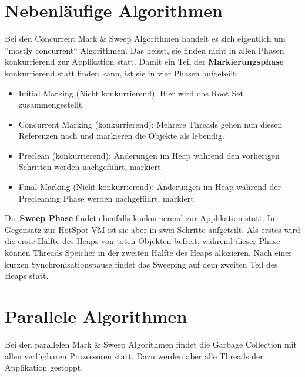 \section{Nebenläufige Algorithmen}
Bei den Concurrent Mark \& Sweep Algorithmen handelt es sich eigentlich um ''mostly concurrent`` Algorithmen. Das heisst, sie finden nicht in allen Phasen konkurrierend zur Applikation statt. Damit ein Teil der \textbf{Markierungsphase} konkurrierend statt finden kann, ist sie in vier Phasen aufgeteilt:
\begin{itemize}
	\item Initial Marking (Nicht konkurrierend): Hier wird das Root Set zusammengestellt.
	\item Concurrent Marking (konkurrierend): Mehrere Threads gehen nun diesen Referenzen nach und markieren die Objekte als lebendig.
	\item Preclean (konkurrierend): Änderungen im Heap während den vorherigen Schritten werden nachgeführt, markiert.
	\item Final Marking (Nicht konkurrierend): Änderungen im Heap während der Precleaning Phase werden nachgeführt, markiert.
\end{itemize}

Die \textbf{Sweep Phase} findet ebenfalls konkurrierend zur Applikation statt. Im Gegensatz zur HotSpot VM ist sie aber in zwei Schritte aufgeteilt. Als erstes wird die erste Hälfte des Heaps von toten Objekten befreit, während dieser Phase können Threads Speicher in der zweiten Hälfte des Heaps allozieren. Nach einer kurzen Synchronisationspause findet das Sweeping auf dem zweiten Teil des Heaps statt.

\section{Parallele Algorithmen}
Bei den parallelen Mark \& Sweep Algorithmen findet die Garbage Collection mit allen verfügbaren Prozessoren statt. Dazu werden aber alle Threads der Applikation gestoppt.


